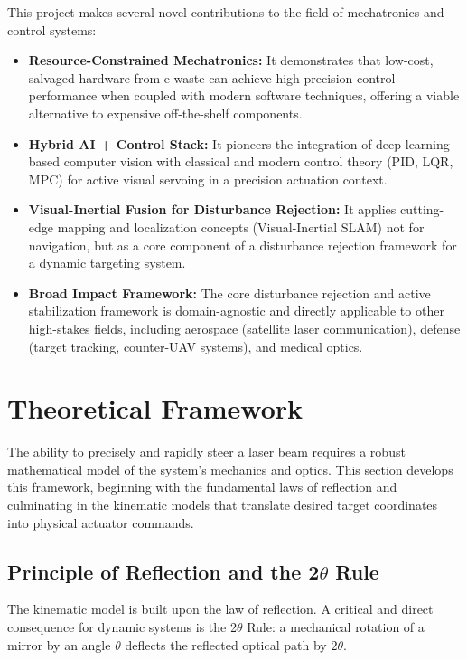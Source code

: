 \documentclass[12pt]{article}
\begin{document}
This project makes several novel contributions to the field of mechatronics and control systems:
\begin{itemize}
    \item \textbf{Resource-Constrained Mechatronics:} It demonstrates that low-cost, salvaged hardware from e-waste can achieve high-precision control performance when coupled with modern software techniques, offering a viable alternative to expensive off-the-shelf components.
    \item \textbf{Hybrid AI + Control Stack:} It pioneers the integration of deep-learning-based computer vision with classical and modern control theory (PID, LQR, MPC) for active visual servoing in a precision actuation context.
    \item \textbf{Visual-Inertial Fusion for Disturbance Rejection:} It applies cutting-edge mapping and localization concepts (Visual-Inertial SLAM) not for navigation, but as a core component of a disturbance rejection framework for a dynamic targeting system.
    \item \textbf{Broad Impact Framework:} The core disturbance rejection and active stabilization framework is domain-agnostic and directly applicable to other high-stakes fields, including aerospace (satellite laser communication), defense (target tracking, counter-UAV systems), and medical optics.
\end{itemize}

\newpage


\section{Theoretical Framework}

The ability to precisely and rapidly steer a laser beam requires a robust mathematical model of the system's mechanics and optics.
 This section develops this framework, beginning with the fundamental laws of reflection and culminating in the kinematic models that translate desired target coordinates into physical actuator commands.

\subsection{Principle of Reflection and the 2\(\theta\) Rule}

The kinematic model is built upon the law of reflection. A critical and direct consequence for dynamic systems is the 2\(\theta\) Rule: a mechanical rotation of a mirror by an angle \(\theta\) deflects the reflected optical path by \(2\theta\).
\end{document}
